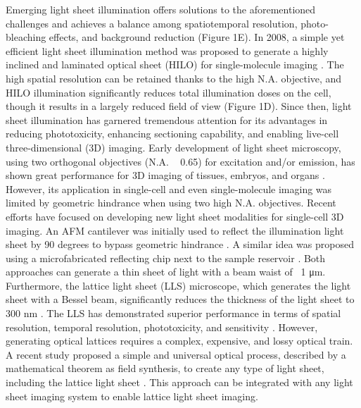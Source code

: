 Emerging light sheet illumination offers solutions to the aforementioned challenges and achieves a balance among spatiotemporal resolution, photo-bleaching effects, and background reduction (Figure 1E). In 2008, a simple yet efficient light sheet illumination method was proposed to generate a highly inclined and laminated optical sheet (HILO) for single-molecule imaging \parencite{Tokunaga2008}. The high spatial resolution can be retained thanks to the high N.A. objective, and HILO illumination significantly reduces total illumination doses on the cell, though it results in a largely reduced field of view (Figure 1D). Since then, light sheet illumination has garnered tremendous attention for its advantages in reducing phototoxicity, enhancing sectioning capability, and enabling live-cell three-dimensional (3D) imaging. Early development of light sheet microscopy, using two orthogonal objectives (N.A. ~ 0.65) for excitation and/or emission, has shown great performance for 3D imaging of tissues, embryos, and organs \parencite{Keller2015,Keller2010,Keller2008,Tomer2011}. However, its application in single-cell and even single-molecule imaging was limited by geometric hindrance when using two high N.A. objectives. Recent efforts have focused on developing new light sheet modalities for single-cell 3D imaging. An AFM cantilever was initially used to reflect the illumination light sheet by 90 degrees to bypass geometric hindrance \parencite{Gebhardt2013}. A similar idea was proposed using a microfabricated reflecting chip next to the sample reservoir \parencite{Galland2015}. Both approaches can generate a thin sheet of light with a beam waist of ~1 μm. Furthermore, the lattice light sheet (LLS) microscope, which generates the light sheet with a Bessel beam, significantly reduces the thickness of the light sheet to 300 nm \parencite{Chen2014}. The LLS has demonstrated superior performance in terms of spatial resolution, temporal resolution, phototoxicity, and sensitivity \parencite{Gao2019}. However, generating optical lattices requires a complex, expensive, and lossy optical train. A recent study proposed a simple and universal optical process, described by a mathematical theorem as field synthesis, to create any type of light sheet, including the lattice light sheet \parencite{Chang2019}. This approach can be integrated with any light sheet imaging system to enable lattice light sheet imaging.

